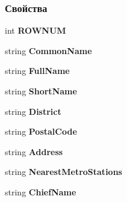 \subsubsection*{Свойства}
\begin{DoxyCompactItemize}
\item 
int {\bfseries R\+O\+W\+N\+U\+M}\hspace{0.3cm}{\ttfamily  [get, set]}\label{classkdz__manager_1_1_registry_office_data_row_a4d8b0af11d5d24e4fe27acb051dd68c0}

\item 
string {\bfseries Common\+Name}\hspace{0.3cm}{\ttfamily  [get, set]}\label{classkdz__manager_1_1_registry_office_data_row_aaddc6d183e79d64b80b4ace5c2495e9b}

\item 
string {\bfseries Full\+Name}\hspace{0.3cm}{\ttfamily  [get, set]}\label{classkdz__manager_1_1_registry_office_data_row_a2c9bf07e0f7c919dfede2f09728bd334}

\item 
string {\bfseries Short\+Name}\hspace{0.3cm}{\ttfamily  [get, set]}\label{classkdz__manager_1_1_registry_office_data_row_a3a016153fc0223aafe80091ff4e5ceac}

\item 
string {\bfseries District}\hspace{0.3cm}{\ttfamily  [get, set]}\label{classkdz__manager_1_1_registry_office_data_row_a15bedb0529df8935aa4c0086e6bccc7b}

\item 
string {\bfseries Postal\+Code}\hspace{0.3cm}{\ttfamily  [get, set]}\label{classkdz__manager_1_1_registry_office_data_row_a66adf95f43e33ffbc2414d100c06a7cf}

\item 
string {\bfseries Address}\hspace{0.3cm}{\ttfamily  [get, set]}\label{classkdz__manager_1_1_registry_office_data_row_aec57182df53b04aceca477433c48ecfc}

\item 
string {\bfseries Nearest\+Metro\+Stations}\hspace{0.3cm}{\ttfamily  [get, set]}\label{classkdz__manager_1_1_registry_office_data_row_a290d8b82d3925cd0435491be2782d7be}

\item 
string {\bfseries Chief\+Name}\hspace{0.3cm}{\ttfamily  [get, set]}\label{classkdz__manager_1_1_registry_office_data_row_a2b949c4066c7da75ac75b9e4c43269d3}


\end{DoxyCompactItemize}
